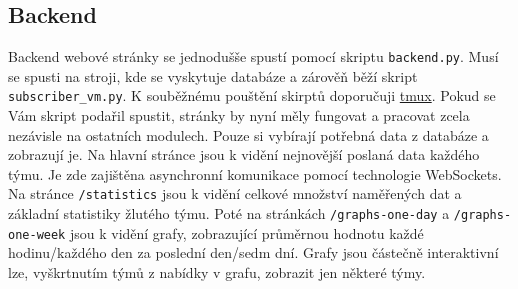 \subsection{Backend}
Backend webové stránky se jednodušše spustí pomocí skriptu \verb|backend.py|. Musí se spusti na stroji, kde se vyskytuje databáze a zárověň běží skript \verb|subscriber_vm.py|. K souběžnému pouštění skirptů doporučuji \href{URLhttps://github.com/tmux/tmux/wiki}{tmux}.
Pokud se Vám skript podařil spustit, stránky by nyní měly fungovat a pracovat zcela nezávisle na ostatních modulech. Pouze si vybírají potřebná data z databáze a zobrazují je.
Na hlavní stránce jsou k vidění nejnovější poslaná data každého týmu. Je zde zajištěna asynchronní komunikace pomocí technologie WebSockets.
Na stránce \verb|/statistics| jsou k vidění celkové množství naměřených dat a základní statistiky žlutého týmu. Poté na stránkách \verb|/graphs-one-day| a \verb|/graphs-one-week| jsou k vidění grafy, zobrazující průměrnou hodnotu každé hodinu/každého den za poslední den/sedm dní.
Grafy jsou částečně interaktivní lze, vyškrtnutím týmů z nabídky v grafu, zobrazit jen některé týmy.   
